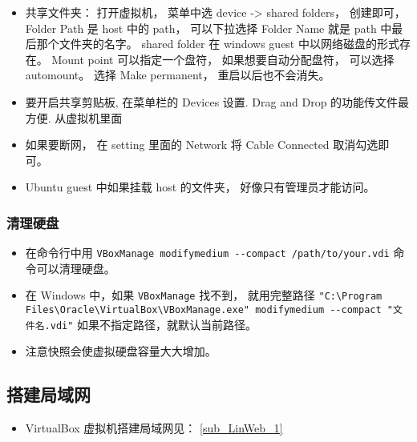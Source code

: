 \begin{itemize}
\item 共享文件夹： 打开虚拟机， 菜单中选 device -> shared folders， 创建即可， Folder Path 是 host 中的 path， 可以下拉选择 Folder Name 就是 path 中最后那个文件夹的名字。 shared folder 在 windows guest 中以网络磁盘的形式存在。 Mount point 可以指定一个盘符， 如果想要自动分配盘符， 可以选择 automount。 选择 Make permanent， 重启以后也不会消失。
\item 要开启共享剪贴板, 在菜单栏的 Devices 设置. Drag and Drop 的功能传文件最方便. 从虚拟机里面
\item 如果要断网， 在 setting 里面的 Network 将 Cable Connected 取消勾选即可。
\item Ubuntu guest 中如果挂载 host 的文件夹， 好像只有管理员才能访问。
\end{itemize}

\subsubsection{清理硬盘}
\begin{itemize}
\item 在命令行中用 \verb|VBoxManage modifymedium --compact /path/to/your.vdi| 命令可以清理硬盘。
\item 在 Windows 中，如果 \verb|VBoxManage| 找不到， 就用完整路径 \verb|"C:\Program Files\Oracle\VirtualBox\VBoxManage.exe" modifymedium --compact "文件名.vdi"| 如果不指定路径，就默认当前路径。
\item 注意快照会使虚拟硬盘容量大大增加。
\end{itemize}

\subsection{搭建局域网}
\begin{itemize}
\item VirtualBox 虚拟机搭建局域网见： \autoref{sub_LinWeb_1}~
\end{itemize}
